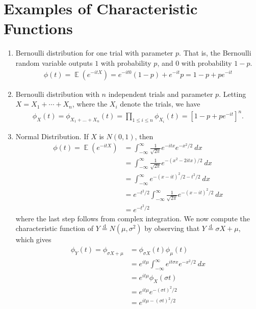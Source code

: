 \documentclass[12pt]{amsbook}
\DeclareMathOperator{\ex}{\mathbb{E}}
\theoremstyle{plain}
\theoremstyle{definition}
\theoremstyle{remark}
\numberwithin{equation}{section}  %
\begin{document}
	\section{Examples of Characteristic Functions}
	\begin{enumerate}
		\item Bernoulli distribution for one trial with parameter $p$. That is,
			the Bernoulli random variable outputs $1$ with probability $p$,
			and $0$ with probability $1-p$.
			\begin{equation*}
				\begin{split}
					\phi(t) = \ex(e^{-itX}) = e^{-it0}(1-p) + e^{-it}p = 1-p + pe^{-it}
				\end{split}
			\end{equation*}
		\item Bernoulli distribution with $n$ independent trials and parameter
			$p$. Letting $X = X_{1} + \cdots + X_{n}$, where the $X_i$ denote
			the trials, we have
			\begin{equation*}
				\begin{split}
					\phi_{X}(t) = \phi_{X_{1} + \ldots + X_{n}}(t)
					= \prod_{1 \le i \le n} \phi_{X_{i}}(t)
					= \left[ 1-p + pe^{-it} \right]^{n}.
				\end{split}
			\end{equation*}
		\item Normal Distribution. If $X$ is $N(0,1)$, then
			\begin{equation*}
				\begin{split}
					\phi(t) = \ex(e^{-itX})
					& = \int_{-\infty}^{\infty} \frac{1}{\sqrt{2 \pi}} e^{-itx}
					e^{-x^{2}/2} \ dx
					\\
					& = \int_{-\infty}^{\infty}\frac{1}{\sqrt{2 \pi}} e^{-(x^{2} -2itx)/2} \
					dx
					\\
					& = \int_{-\infty}^{\infty} e^{-(x-it)^{2}/2 - t^{2}/2} \ dx
					\\
					& = e^{-t^{2}/2} \int_{-\infty}^{\infty} \frac{1}{\sqrt{2 \pi}}
					e^{-(x - it)^{2}/2} \ dx
					\\
					& = e^{-t^{2}/2}
				\end{split}
			\end{equation*}
			where the last step follows from complex integration.	
			We now compute the characteristic function of $Y \overset{\text{d}}{=}N(\mu,
			\sigma^{2})$ by observing that $Y \overset{\text{d}}{=} \sigma X + \mu$,
			which gives
			\begin{equation*}
				\begin{split}
					\phi_{Y}(t) = \phi_{\sigma X + \mu}
					& =  \phi_{\sigma X}(t) \phi_{\mu}(t)
					\\
					& = e^{it\mu} \int_{-\infty}^{\infty} e^{i t \sigma x} e^{-x^{2}/2} \ dx
					\\
					& = e^{it \mu} \phi_{X}(\sigma t)
					\\
					& = e^{it \mu} e^{-( \sigma t)^{2}/2}
					\\
					& = e^{it \mu - (\sigma t)^{2}/2}
				\end{split}
			\end{equation*}
	\end{enumerate}
\end{document}
